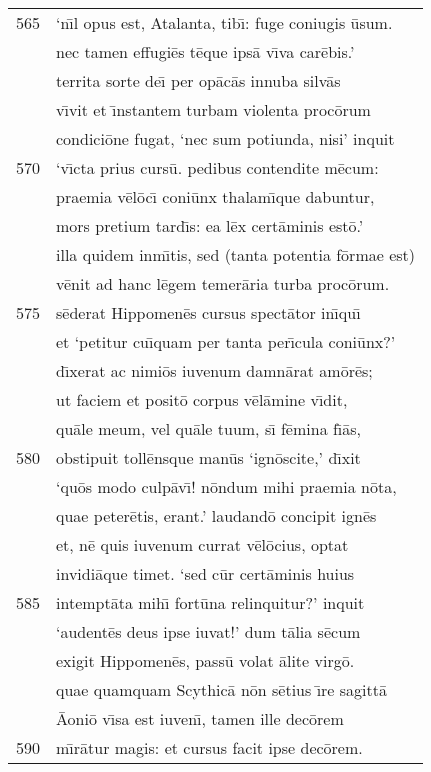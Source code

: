 \documentclass[paper=6in:9in,pagesize=pdftex,
               headinclude=on,footinclude=on,12pt]{scrbook}
\begin{document}
\begin{longtable}[p]{ r l }
565 & `n\={\i}l opus est, Atalanta, tib\={\i}: fuge coniugis \=usum.\\ 
 & nec tamen effugi\=es t\=eque ips\=a v\={\i}va car\=ebis.'\\ 
 & territa sorte de\={\i} per op\=ac\=as innuba silv\=as\\ 
 & v\={\i}vit et \={\i}nstantem turbam violenta proc\=orum\\ 
 & condici\=one fugat, `nec sum potiunda, nisi' inquit\\ 
570 & `v\={\i}cta prius curs\=u. pedibus contendite m\=ecum:\\ 
 & praemia v\=el\=oc\={\i} coni\=unx thalam\={\i}que dabuntur,\\ 
 & mors pretium tard\={\i}s: ea l\=ex cert\=aminis est\=o.'\\ 
 & illa quidem inm\={\i}tis, sed (tanta potentia f\=ormae est)\\ 
 & v\=enit ad hanc l\=egem temer\=aria turba proc\=orum.\\ 
575 & s\=ederat Hippomen\=es cursus spect\=ator in\={\i}qu\={\i}\\ 
 & et `petitur cu\={\i}quam per tanta per\={\i}cula coni\=unx?'\\ 
 & d\={\i}xerat ac nimi\=os iuvenum damn\=arat am\=or\=es;\\ 
 & ut faciem et posit\=o corpus v\=el\=amine v\={\i}dit,\\ 
 & qu\=ale meum, vel qu\=ale tuum, s\={\i} f\=emina f\={\i}\=as,\\ 
580 & obstipuit toll\=ensque man\=us `ign\=oscite,' d\={\i}xit\\ 
 & `qu\=os modo culp\=av\={\i}! n\=ondum mihi praemia n\=ota,\\ 
 & quae peter\=etis, erant.' laudand\=o concipit ign\=es\\ 
 & et, n\=e quis iuvenum currat v\=el\=ocius, optat\\ 
 & invidi\=aque timet. `sed c\=ur cert\=aminis huius\\ 
585 & intempt\=ata mih\={\i} fort\=una relinquitur?' inquit\\ 
 & `audent\=es deus ipse iuvat!' dum t\=alia s\=ecum\\ 
 & exigit Hippomen\=es, pass\=u volat \=alite virg\=o.\\ 
 & quae quamquam Scythic\=a n\=on s\=etius \={\i}re sagitt\=a\\ 
 & \=Aoni\=o v\={\i}sa est iuven\={\i}, tamen ille dec\=orem\\ 
590 & m\={\i}r\=atur magis: et cursus facit ipse dec\=orem.\\ 

\end{longtable}
\end{document}
